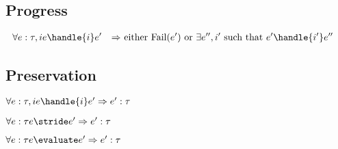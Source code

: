 \subsection{Progress}

\begin{align*}
  \forall e:\tau,i & e \handle{i} e' &\implies& \text{ either Fail}(e') \text{ or } \exists e'',i' \text{ such that } e'\handle{i'}e''&\\
\end{align*}

\subsection{Preservation}

\begin{theorem}
  $\forall e:\tau,i  e \handle{i} e' \implies e':\tau$
  \label{thmpreshandle}
\end{theorem}

\begin{theorem}
    $\forall e:\tau  e \stride e' \implies e':\tau$
    \label{thmpresnorm}
\end{theorem}

\begin{theorem}
      $\forall e:\tau  e \evaluate e' \implies e':\tau$
      \label{thmpreseval}
\end{theorem}

